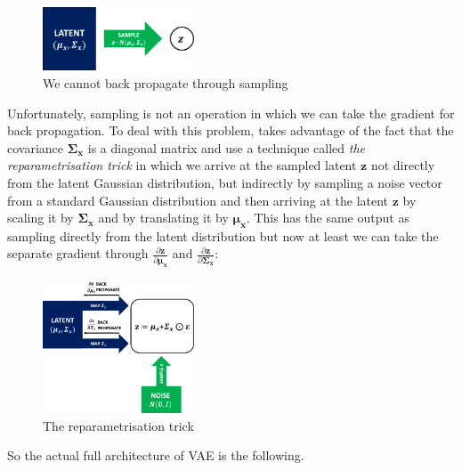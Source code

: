             \begin{figure}[H]
                \centering
                \includegraphics[width=0.4\textwidth]{imgs/sampling.png}
                \caption{We cannot back propagate through sampling}
                \label{fig:sampling}
            \end{figure}
            
            Unfortunately, sampling is not an operation in which we can take the gradient for back propagation. To deal with this problem, \cite{kingma2013auto} takes advantage of the fact that the covariance $\bm{\Sigma_x}$ is a diagonal matrix and use a technique called \textit{the reparametrisation trick} in which we arrive at the sampled latent $\bm{z}$ not directly from the latent Gaussian distribution, but indirectly by sampling a noise vector from a standard Gaussian distribution and then arriving at the latent $\bm{z}$ by scaling it by $\bm{\Sigma_x}$ and by translating it by $\bm{\mu_x}$. This has the same output as sampling directly from the latent distribution but now at least we can take the separate gradient through $\frac{\partial \bm{z}}{\partial \bm{\mu_x}}$ and $\frac{\partial \bm{z}}{\partial \bm{\Sigma_x}}$:
            
            \begin{figure}[H]
                \centering
                \includegraphics[width=0.4\textwidth]{imgs/reparametrisation_trick.png}
                \caption{The reparametrisation trick}
                \label{fig:reparametrisation_trick}
            \end{figure}
            
            So the actual full architecture of VAE is the following.
            
